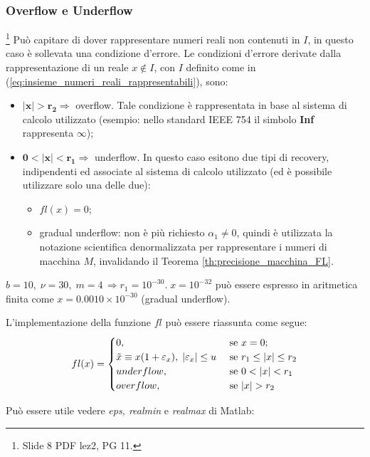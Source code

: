 \subsubsection{Overflow e Underflow}\footnote{Slide 8 PDF lez2, PG 11.}
Può capitare di dover rappresentare numeri reali non contenuti in $I$, in questo caso è sollevata una condizione d'errore. Le condizioni d'errore derivate dalla rappresentazione di un reale $x\notin I$, con $I$ definito come in (\ref{eq:insieme_numeri_reali_rappresentabili}), sono:
\begin{itemize}
	\item $\boldsymbol{|x|>r_2}\Rightarrow$ overflow. Tale condizione è rappresentata in base al sistema di calcolo utilizzato (esempio: nello standard IEEE 754 il simbolo \textbf{Inf} rappresenta $\infty$);
	\item $\boldsymbol{0<|x|<r_1}\Rightarrow$ underflow. In questo caso esitono due tipi di recovery, indipendenti ed associate al sistema di calcolo utilizzato (ed è possibile utilizzare solo una delle due):
	\begin{itemize}
		\item $fl(x)=0$;
		\item gradual underflow: non è più richiesto $\alpha_1\neq 0$, quindi è utilizzata la notazione scientifica denormalizzata per rappresentare i numeri di macchina $M$, invalidando il Teorema \ref{th:precisione_macchina_FL}. 
	\end{itemize}
\end{itemize}

\begin{example}
	$b=10,\; \nu=30,\; m=4\, \Rightarrow r_1=10^{-30}.\; x=10^{-32}$ può essere espresso in aritmetica finita come $x=0.0010\times 10^{-30}$ (gradual underflow).
\end{example}

L'implementazione della funzione $fl$ può essere riassunta come segue:
\begin{align*}
	fl(x)=\begin{cases}
		0, &\text{ se } x=0;\\
		\Tilde{x}\equiv x(1+\varepsilon_x),\; |\varepsilon_x|\leq u &\text{ se } r_1\leq|x|\leq r_2\\
		underflow, &\text{ se } 0<|x|<r_1\\
		overflow, &\text{ se } |x|>r_2
	\end{cases}
\end{align*}

\begin{remark}\label{rem:epsRMaxRmin}
	Può essere utile vedere \textit{eps, realmin} e \textit{realmax} di Matlab:
\end{remark}

